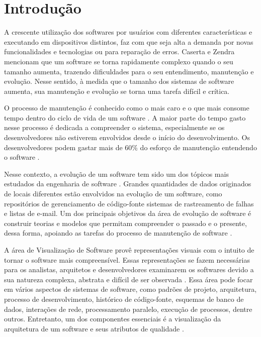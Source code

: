 \chapter{Introdução} \label{ch:introducao}

A crescente utilização dos softwares por usuários com diferentes características e executando em dispositivos distintos, faz com que seja alta a demanda por novas funcionalidades e tecnologias ou para reparação de erros. Caserta e Zendra \cite{Caserta2011} mencionam que um software se torna rapidamente complexo quando o seu tamanho aumenta, trazendo dificuldades para o seu entendimento, manutenção e evolução. Nesse sentido, à medida que o tamanho dos sistemas de software aumenta, sua manutenção e evolução se torna uma tarefa difícil e crítica.

O processo de manutenção é conhecido como o mais caro e o que mais consome tempo dentro do ciclo de vida de um software \cite{Abreu1995}. A maior parte do tempo gasto nesse processo é dedicada a compreender o sistema, especialmente se os desenvolvedores não estiverem envolvidos desde o início do desenvolvimento. Os desenvolvedores podem gastar mais de 60\% do esforço de manutenção entendendo o software \cite{Corbi1989}.

Nesse contexto, a evolução de um software tem sido um dos tópicos mais estudados da engenharia de software \cite{Magnavita2015}. Grandes quantidades de dados originados de locais diferentes estão envolvidos na evolução de um software, como repositórios de gerenciamento de código-fonte  sistemas de rastreamento de falhas e listas de e-mail. Um dos principais objetivos da área de evolução de software é construir teorias e modelos que permitam compreender o passado e o presente, dessa forma, apoiando as tarefas do processo de manutenção de software \cite{Novais2013}.

A área de Visualização de Software provê representações visuais com o intuito de tornar o software mais compreensível. Essas representações se fazem necessárias para os analistas, arquitetos e desenvolvedores examinarem os softwares devido a sua natureza complexa, abstrata e difícil de ser observada \cite{Petre2006}. Essa área pode focar em vários aspectos de sistemas de software, como padrões de projeto, arquitetura, processo de desenvolvimento, histórico de código-fonte, esquemas de banco de dados, interações de rede, processamento paralelo, execução de processos, dentre outros. Entretanto, um dos componentes essenciais é a visualização da arquitetura de um software e seus atributos de qualidade \cite{Ghanam2008}.

